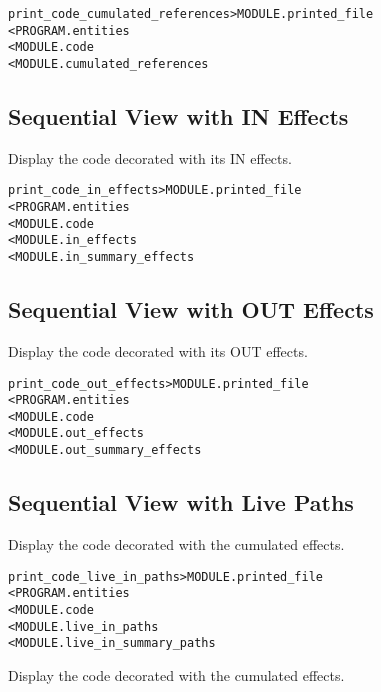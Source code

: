 \documentclass[a4paper]{report}
\newenvironment{PipsMake}{\begin{alltt}}{\end{alltt}}
\newenvironment{PipsPass}[1]{\label{pass:#1}}{}
\begin{document}
\begin{PipsMake}
print_code_cumulated_references    > MODULE.printed_file
        < PROGRAM.entities
        < MODULE.code
        < MODULE.cumulated_references
\end{PipsMake}


\subsection{Sequential View with IN Effects}
\begin{PipsPass}{print_code_in_effects}
Display the code decorated with its IN effects.
\end{PipsPass}

\begin{PipsMake}
print_code_in_effects       > MODULE.printed_file
        < PROGRAM.entities
        < MODULE.code
        < MODULE.in_effects
        < MODULE.in_summary_effects
\end{PipsMake}

\subsection{Sequential View with OUT Effects}
\begin{PipsPass}{print_code_out_effects}
Display the code decorated with its OUT effects.
\end{PipsPass}

\begin{PipsMake}
print_code_out_effects       > MODULE.printed_file
        < PROGRAM.entities
        < MODULE.code
        < MODULE.out_effects
        < MODULE.out_summary_effects
\end{PipsMake}


\subsection{Sequential View with Live Paths}

\begin{PipsPass}{print_code_live_in_paths}
Display the code decorated with the cumulated effects.
\end{PipsPass}

\begin{PipsMake}
print_code_live_in_paths    > MODULE.printed_file
        < PROGRAM.entities
        < MODULE.code
        < MODULE.live_in_paths
        < MODULE.live_in_summary_paths
\end{PipsMake}

\begin{PipsPass}{print_code_live_out_paths}
Display the code decorated with the cumulated effects.
\end{PipsPass}
\end{document}
